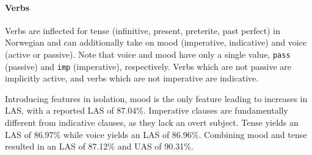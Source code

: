 \documentclass[11pt,a4paper]{article}
\begin{document}

\paragraph{Verbs}
Verbs are inflected for tense (infinitive, present, preterite, past perfect)
in Norwegian and can additionally take on mood (imperative, indicative) and
voice (active or passive). Note that voice and mood have only a single value,
\texttt{pass} (passive) and \texttt{imp} (imperative), respectively. Verbs
which are not passive are implicitly active, and verbs which are not imperative
are indicative.

Introducing features in isolation, mood is the only feature leading to
increases in LAS, with a reported LAS of 87.04\%. Imperative clauses are
fundamentally different from indicative clauses, as they lack an overt subject.
Tense yields an LAS of 86.97\% while voice yields an LAS of 86.96\%. Combining
mood and tense resulted in an LAS of 87.12\% and UAS of 90.31\%.
\end{document}
